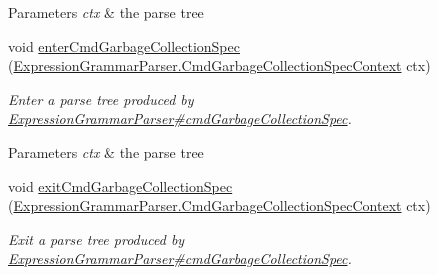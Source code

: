 \begin{DoxyCompactItemize}
\begin{DoxyCompactList}
\begin{DoxyParams}{Parameters}
{\em ctx} & the parse tree\\
\hline
\end{DoxyParams}
 \end{DoxyCompactList}\item 
void \hyperlink{classgov_1_1nasa_1_1jpf_1_1inspector_1_1server_1_1expression_1_1parser_1_1_expression_grammar_base_listener_a1df60bcdba1592c4df8ef40b8ba6c078}{enter\+Cmd\+Garbage\+Collection\+Spec} (\hyperlink{classgov_1_1nasa_1_1jpf_1_1inspector_1_1server_1_1expression_1_1parser_1_1_expression_grammar_pa9b16c5c3aaa9986dba28b01bf7446bf9}{Expression\+Grammar\+Parser.\+Cmd\+Garbage\+Collection\+Spec\+Context} ctx)
\begin{DoxyCompactList}\small\item\em Enter a parse tree produced by \hyperlink{classgov_1_1nasa_1_1jpf_1_1inspector_1_1server_1_1expression_1_1parser_1_1_expression_grammar_parser_a2218573ae0b280b9f81bd8a58b34932c}{Expression\+Grammar\+Parser\#cmd\+Garbage\+Collection\+Spec}.


\begin{DoxyParams}{Parameters}
{\em ctx} & the parse tree\\
\hline
\end{DoxyParams}
 \end{DoxyCompactList}\item 
void \hyperlink{classgov_1_1nasa_1_1jpf_1_1inspector_1_1server_1_1expression_1_1parser_1_1_expression_grammar_base_listener_a20ca76a4e00206604448f944fcf20d3f}{exit\+Cmd\+Garbage\+Collection\+Spec} (\hyperlink{classgov_1_1nasa_1_1jpf_1_1inspector_1_1server_1_1expression_1_1parser_1_1_expression_grammar_pa9b16c5c3aaa9986dba28b01bf7446bf9}{Expression\+Grammar\+Parser.\+Cmd\+Garbage\+Collection\+Spec\+Context} ctx)
\begin{DoxyCompactList}\small\item\em Exit a parse tree produced by \hyperlink{classgov_1_1nasa_1_1jpf_1_1inspector_1_1server_1_1expression_1_1parser_1_1_expression_grammar_parser_a2218573ae0b280b9f81bd8a58b34932c}{Expression\+Grammar\+Parser\#cmd\+Garbage\+Collection\+Spec}.



\end{DoxyCompactList}
\end{DoxyCompactItemize}
